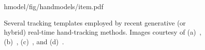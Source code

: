 \providecommand{\yoff}{0}
\begin{figure}[t!]
\centering
\begin{overpic} 
[width=\linewidth]
{hmodel/fig/handmodels/item.pdf}
\end{overpic}
\caption{
% 
%
Several tracking templates employed by recent generative (or hybrid) real-time hand-tracking methods.
% 
Images courtesy of
(a)~\protect\cite{oiko2011hand},
(b)~\protect\cite{sridhar2013multicam}, 
(c)~\protect\cite{taylor2016joint}, and
(d)~\protect\cite{melax2013dynamics}.
% 
% 
}
\label{fig:handmodels}
\end{figure}

